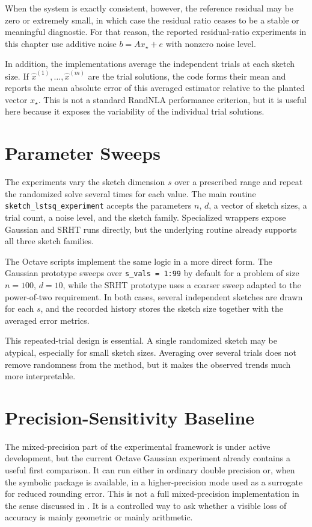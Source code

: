 When the system is exactly consistent, however, the reference residual may be
zero or extremely small, in which case the residual ratio ceases to be a stable or
meaningful diagnostic. For that reason, the reported residual-ratio experiments in
this chapter use additive noise \(b = Ax_\star + e\) with nonzero noise level.

In addition, the implementations average the independent trials at each sketch
size. If \(\hat x^{(1)},\dots,\hat x^{(m)}\) are the trial solutions, the code forms
their mean and reports the mean absolute error of this averaged estimator relative
to the planted vector \(x_\star\). This is not a standard RandNLA performance
criterion, but it is useful here because it exposes the variability of the individual
trial solutions.

\section{Parameter Sweeps}

The experiments vary the sketch dimension \(s\) over a prescribed range and
repeat the randomized solve several times for each value. The main routine
\texttt{sketch\_lstsq\_experiment} accepts the parameters \(n\),
\(d\), a vector of sketch sizes, a trial count, a noise level, and the sketch family.
Specialized wrappers expose Gaussian and SRHT runs directly, but the
underlying routine already supports all three sketch families.

The Octave scripts implement the same logic in a more direct form. The Gaussian
prototype sweeps over \texttt{s\_vals = 1:99} by default for a problem of size
\(n=100\), \(d=10\), while the SRHT prototype uses a coarser sweep adapted to the
power-of-two requirement. In both cases, several independent sketches are drawn
for each \(s\), and the recorded history stores the sketch size together with the
averaged error metrics.

This repeated-trial design is essential. A single randomized sketch may be
atypical, especially for small sketch sizes. Averaging over several trials does not
remove randomness from the method, but it makes the observed trends much more
interpretable.

\section{Precision-Sensitivity Baseline}

The mixed-precision part of the experimental framework is under active development, but the
current Octave Gaussian experiment already contains a useful first comparison. It
can run either in ordinary double precision or, when the symbolic package is
available, in a higher-precision mode used as a surrogate for reduced rounding
error. This is not a full mixed-precision implementation in the sense discussed
in . It is a controlled way to ask whether a visible loss of
accuracy is mainly geometric or mainly arithmetic.

